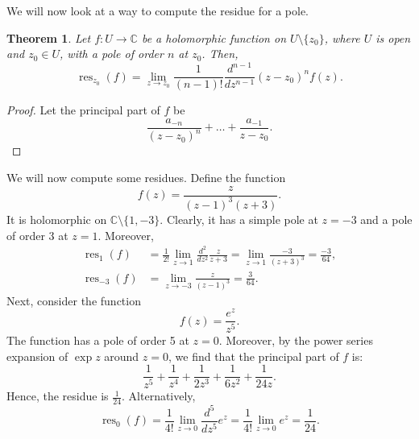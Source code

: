 \documentclass[a4paper, openany]{memoir}
\theoremstyle{definition}
\theoremstyle{plain}
\newtheorem{theorem}[definition]{Theorem}
\begin{document}
    We will now look at a way to compute the residue for a pole.
    \begin{theorem}
        Let $f \colon U \to \mathbb{C}$ be a holomorphic function on $U \setminus \{z_0\}$, where $U$ is open and $z_0 \in U$, with a pole of order $n$ at $z_0$. Then,
        \[\operatorname{res}_{z_0}(f) = \lim_{z \to z_0} \frac{1}{(n-1)!} \frac{d^{n-1}}{dz^{n-1}} (z - z_0)^n f(z).\]
    \end{theorem}
    \begin{proof}
        Let the principal part of $f$ be
        \[\frac{a_{-n}}{(z - z_0)^n} + \dots + \frac{a_{-1}}{z - z_0}.\]
    \end{proof}
    \noindent We will now compute some residues. Define the function 
    \[f(z) = \frac{z}{(z - 1)^3 (z + 3)}.\]
    It is holomorphic on $\mathbb{C} \setminus \{1, -3\}$. Clearly, it has a simple pole at $z = -3$ and a pole of order 3 at $z = 1$. Moreover,
    \begin{align*}
        \operatorname{res}_{1}(f) &= \frac{1}{2!} \lim_{z \to 1} \frac{d^2}{dz^2} \frac{z}{z+3} = \lim_{z \to 1} \frac{-3}{(z + 3)^3} = \frac{-3}{64}, \\
        \operatorname{res}_{-3}(f) &= \lim_{z \to -3} \frac{z}{(z - 1)^3} = \frac{3}{64}.
    \end{align*}
    Next, consider the function
    \[f(z) = \frac{e^z}{z^5}.\]
    The function has a pole of order 5 at $z = 0$. Moreover, by the power series expansion of $\exp z$ around $z = 0$, we find that the principal part of $f$ is:
    \[\frac{1}{z^5} + \frac{1}{z^4} + \frac{1}{2z^3} + \frac{1}{6z^2} + \frac{1}{24z}.\]
    Hence, the residue is $\frac{1}{24}$. Alternatively,
    \[\operatorname{res}_{0}(f) = \frac{1}{4!} \lim_{z \to 0} \frac{d^5}{dz^5} e^z = \frac{1}{4!} \lim_{z \to 0} e^z = \frac{1}{24}.\]
\end{document}
